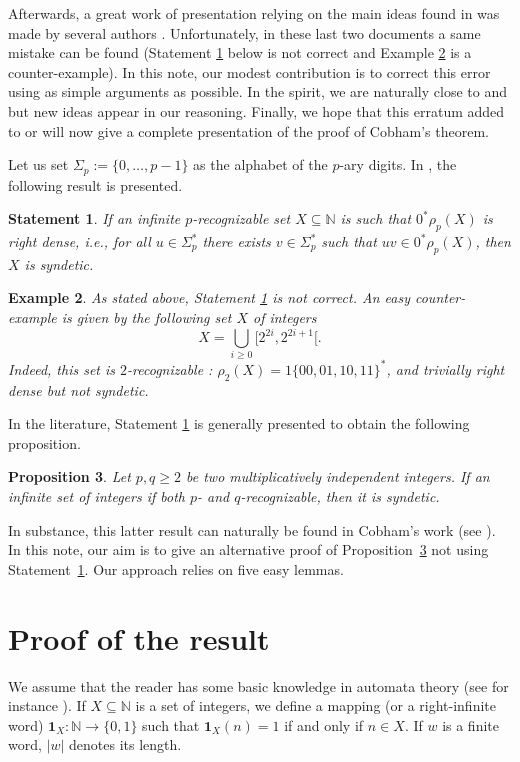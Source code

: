 \documentclass{beatcs}
\newtheorem{proposition}{Proposition}
\newtheorem{example}[proposition]{Example}
\newtheorem{sta}[proposition]{Statement}
\begin{document}
Afterwards, a great work of presentation relying on the main ideas
found in \cite{Ha1} was made by several authors \cite{AS,Pe}.
Unfortunately, in these last two documents a same mistake can be found
(Statement \ref{lem:faux} below is not correct and
Example \ref{exa:c} is a counter-example). In this note, our modest
contribution is to correct this error using as simple arguments as
possible. In the spirit, we are naturally close to \cite{Co} and
\cite{Ha1} but new ideas appear in our reasoning.  Finally, we hope
that this erratum added to \cite{Pe} or \cite{AS} will now give a
complete presentation of the proof of Cobham's theorem.

Let us set $\Sigma_p:=\{0,\ldots,p-1\}$ as the alphabet of the $p$-ary
digits. In \cite{AS,Pe}, the following result is presented.
\begin{sta}\label{lem:faux}
  If an infinite $p$-recognizable set $X\subseteq\mathbb{N}$ is such
  that $0^*\rho_p(X)$ is right dense, i.e., for all $u\in\Sigma_p^*$
  there exists $v\in\Sigma_p^*$ such that $uv\in0^*\rho_p(X)$, then
  $X$ is syndetic.
\end{sta}

\begin{example}\label{exa:c}
  As stated above, Statement \ref{lem:faux} is not correct.  An easy
  counter-example is given by the following set $X$ of integers
  $$X=\bigcup_{i\ge 0}[2^{2i},2^{2i+1}[.$$
  Indeed, this set is
  $2$-recognizable : $\rho_2(X)=1\{00,01,10,11\}^*$, and trivially
  right dense but not syndetic.
\end{example}
In the literature, Statement \ref{lem:faux} is generally presented to
obtain the following proposition.

\begin{proposition}\label{pro:1}\cite[Prop. 5]{Ha1}
  Let $p,q\ge 2$ be two multiplicatively independent integers. If an
  infinite set of integers if both $p$- and $q$-recognizable, then it
  is syndetic.
\end{proposition}
In substance, this latter result can naturally be found in Cobham's
work (see \cite[Lemma 3]{Co}). In this note, our aim is to give an
alternative proof of Proposition~\ref{pro:1} not using
Statement~\ref{lem:faux}. Our approach relies on five easy lemmas.

\section{Proof of the result}

We assume that the reader has some basic knowledge in automata theory
(see for instance \cite{Ei}). If $X\subseteq\mathbb{N}$ is a set of
integers, we define a mapping (or a right-infinite word)
$\mathbf{1}_X:\mathbb{N}\to\{0,1\}$ such that $\mathbf{1}_X(n)=1$ if
and only if $n\in X$. If $w$ is a finite word, $|w|$ denotes its length.
\end{document}
